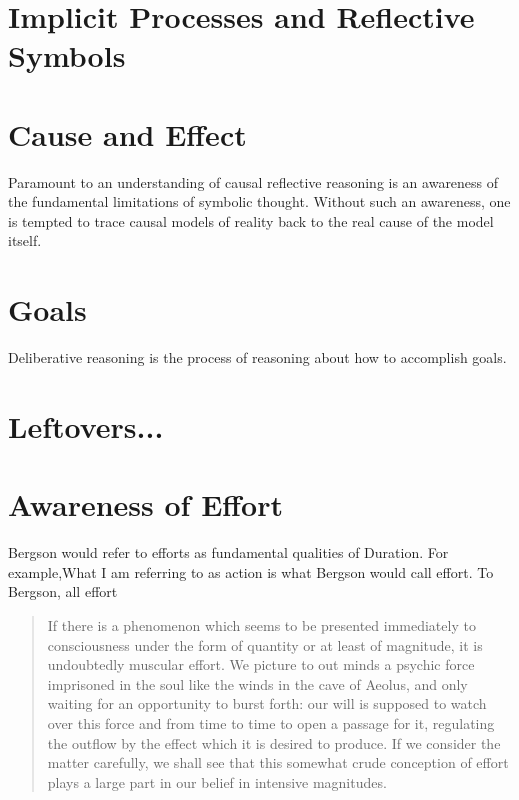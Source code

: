 \section{Implicit Processes and Reflective Symbols}



\section{Cause and Effect}

Paramount to an understanding of causal reflective reasoning is an
awareness of the fundamental limitations of symbolic thought.  Without
such an awareness, one is tempted to trace causal models of reality
back to the real cause of the model itself.  

\section{Goals}

Deliberative reasoning is the process of reasoning about how to
accomplish goals.  



\section{Leftovers...}

\section{Awareness of Effort}

Bergson would refer to efforts as fundamental qualities of Duration.
For example,What I am referring to as action is what Bergson would
call effort.  To Bergson, all effort

\begin{quote}
If there is a phenomenon which seems to be presented immediately to
consciousness under the form of quantity or at least of magnitude, it
is undoubtedly muscular effort.  We picture to out minds a psychic
force imprisoned in the soul like the winds in the cave of Aeolus, and
only waiting for an opportunity to burst forth: our will is supposed
to watch over this force and from time to time to open a passage for
it, regulating the outflow by the effect which it is desired to
produce.  If we consider the matter carefully, we shall see that this
somewhat crude conception of effort plays a large part in our belief
in intensive magnitudes.
\end{quote}

